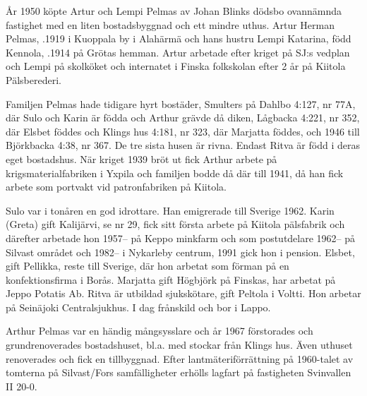 År 1950 köpte Artur och Lempi Pelmas av Johan Blinks dödsbo ovannämnda fastighet med en liten bostadsbyggnad och ett mindre uthus. Artur Herman Pelmas, .1919 i Kuoppala by i Alahärmä och hans hustru Lempi Katarina, född Kennola, .1914 på Grötas hemman. Artur arbetade efter kriget på SJ:s vedplan och Lempi på skolköket och internatet i Finska folkskolan efter 2 år på Kiitola 	Pälsberederi.
\begin{jhchildren}
  \item {}
  \item {}
  \item {}
  \item {}
  \item {}
\end{jhchildren}
Familjen Pelmas hade tidigare hyrt bostäder, Smulters på Dahlbo 4:127, nr 77A, där Sulo och Karin är födda och Arthur grävde då diken, Lågbacka 4:221, nr 352, där Elsbet föddes och Klings hus 4:181, nr 323, där Marjatta föddes, och 1946 till Björkbacka 4:38, nr 367. De tre sista husen är rivna. Endast Ritva är född i deras eget bostadshus. När kriget 1939 bröt ut fick Arthur arbete på krigsmaterialfabriken i Yxpila och familjen bodde då där till 1941, då han fick arbete som portvakt vid patronfabriken på Kiitola.

Sulo var i tonåren en god idrottare. Han emigrerade till Sverige 1962. Karin (Greta) gift Kalijärvi, se nr 29, fick sitt första arbete på Kiitola pälsfabrik och därefter arbetade hon 1957-- på Keppo minkfarm och som postutdelare 1962-- på Silvast området och 1982-- i Nykarleby centrum, 1991 gick hon i pension. Elsbet, gift Pellikka, reste till Sverige, där hon arbetat som förman på en konfektionsfirma i Borås. Marjatta gift Högbjörk på Finskas, har arbetat på Jeppo Potatis Ab. Ritva är utbildad sjukskötare, gift Peltola i Voltti. Hon arbetar på Seinäjoki Centralsjukhus. I dag frånskild och bor i Lappo.

Arthur Pelmas var en händig mångsysslare och år 1967 förstorades och grundrenoverades bostadshuset, bl.a. med stockar från Klings hus. Även uthuset renoverades och fick en tillbyggnad. Efter lantmäteriförrättning på 1960-talet av tomterna på Silvast/Fors samfälligheter erhölls lagfart på fastigheten Svinvallen II 20-0.

